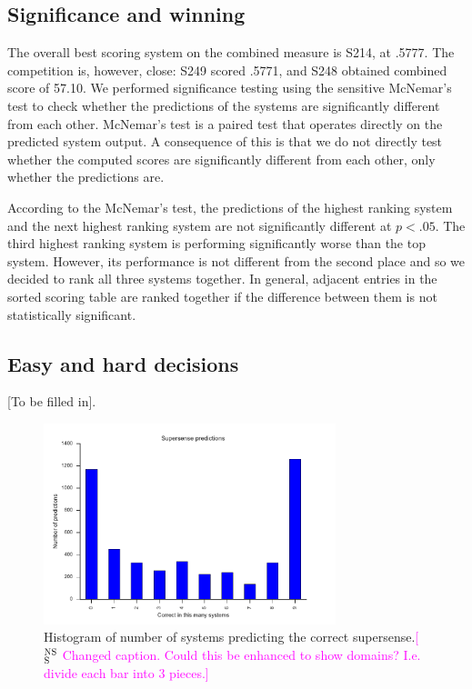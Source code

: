 \documentclass[11pt,letterpaper]{article}
\newcommand{\ensuretext}[1]{#1}
\newcommand{\nssmarker}{\ensuretext{\textcolor{magenta}{\ensuremath{^{\textsc{NS}}_{\textsc{S}}}}}}
\newcommand{\arkcomment}[3]{\ensuretext{\textcolor{#3}{[#1 #2]}}}
\newcommand{\nss}[1]{\arkcomment{\nssmarker}{#1}{magenta}}
\begin{document}
\subsection{Significance and winning}

The overall best scoring system on the combined measure is S214, at .5777. The competition is, however, close: S249 scored .5771, and S248 obtained combined score of 57.10. We performed significance testing using the  sensitive McNemar's test to check whether the predictions of the systems are significantly different from each other. McNemar's test is a paired test that operates directly on the predicted system output. A consequence of this is that we do not directly test whether the computed scores are significantly different from each other, only whether the predictions are. 

According to the McNemar's test, the predictions of the highest ranking system and the next highest ranking system are not significantly different at $p < .05$. The third highest ranking system is performing significantly worse than the top system. However, its performance is not different from the second place and so we decided to rank all three systems together. In general, adjacent entries in the sorted scoring table are ranked together if the difference between them is not statistically significant. 

\subsection{Easy and hard decisions}

[To be filled in]. 

\begin{figure}
		\includegraphics[width=8.5cm]{figs/supersense_predictions.pdf}
	\caption{Histogram of number of systems predicting the correct supersense.\nss{Changed caption. Could this be enhanced to show domains? I.e. divide each bar into 3 pieces.}}
	\label{fig:supersense-predictions}
\end{figure}
\end{document}
